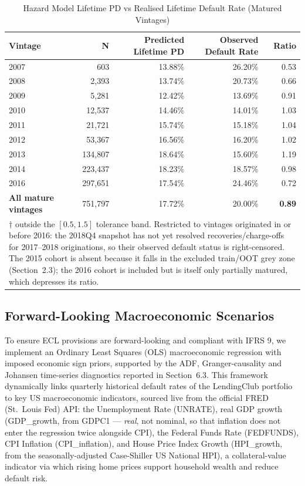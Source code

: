 \documentclass[11pt,a4paper]{article}
\begin{document}
\begin{table}[H]
\centering
\caption{Hazard Model Lifetime PD vs Realised Lifetime Default Rate (Matured Vintages)}
\label{tab:lifetime_pd_calibration}
\vspace{0.5em}
\begin{tabular}{lrrrr}
\toprule
\textbf{Vintage} & \textbf{N} & \textbf{Predicted Lifetime PD} & \textbf{Observed Default Rate} & \textbf{Ratio} \\
\midrule
2007 & 603 & 13.88\% & 26.20\% & 0.53 \\
2008 & 2,393 & 13.74\% & 20.73\% & 0.66 \\
2009 & 5,281 & 12.42\% & 13.69\% & 0.91 \\
2010 & 12,537 & 14.46\% & 14.01\% & 1.03 \\
2011 & 21,721 & 15.74\% & 15.18\% & 1.04 \\
2012 & 53,367 & 16.56\% & 16.20\% & 1.02 \\
2013 & 134,807 & 18.64\% & 15.60\% & 1.19 \\
2014 & 223,437 & 18.23\% & 18.57\% & 0.98 \\
2016 & 297,651 & 17.54\% & 24.46\% & 0.72 \\
\midrule
\textbf{All mature vintages} & 751,797 & 17.72\% & 20.00\% & \textbf{0.89} \\
\bottomrule
\multicolumn{5}{p{0.95\linewidth}}{\footnotesize $\dagger$ outside the $[0.5, 1.5]$ tolerance band. Restricted to vintages originated in or before 2016: the 2018Q4 snapshot has not yet resolved recoveries/charge-offs for 2017--2018 originations, so their observed default status is right-censored. The 2015 cohort is absent because it falls in the excluded train/OOT grey zone (Section~2.3); the 2016 cohort is included but is itself only partially matured, which depresses its ratio.} \\
\end{tabular}
\end{table}

\subsection{Forward-Looking Macroeconomic Scenarios}
To ensure ECL provisions are forward-looking and compliant with IFRS 9, we implement an Ordinary Least Squares (OLS) macroeconomic regression with imposed economic sign priors, supported by the ADF, Granger-causality and Johansen time-series diagnostics reported in Section~6.3. This framework dynamically links quarterly historical default rates of the LendingClub portfolio to key US macroeconomic indicators, sourced live from the official FRED (St.\ Louis Fed) API: the Unemployment Rate (UNRATE), real GDP growth (GDP\_growth, from GDPC1 --- \emph{real}, not nominal, so that inflation does not enter the regression twice alongside CPI), the Federal Funds Rate (FEDFUNDS), CPI Inflation (CPI\_inflation), and House Price Index Growth (HPI\_growth, from the seasonally-adjusted Case-Shiller US National HPI), a collateral-value indicator via which rising home prices support household wealth and reduce default risk.
\end{document}

